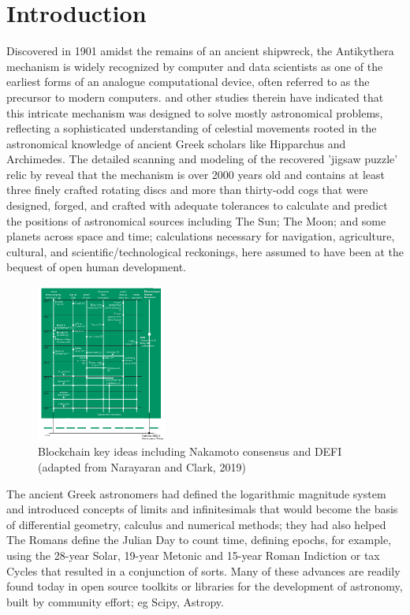 \documentclass[final,5p,times,twocolumn,authoryear]{elsarticle}
\begin{document}
\section{Introduction}
\label{sec:intro}
%
Discovered in 1901 amidst the remains of an ancient shipwreck, the Antikythera mechanism is widely recognized by computer and data scientists as one of the earliest forms of an analogue computational device, often referred to as the precursor to modern computers. \cite{Freeth2021} and other studies therein have indicated that this intricate mechanism was designed to solve mostly astronomical problems, reflecting a sophisticated understanding of celestial movements rooted in the astronomical knowledge of ancient Greek scholars like Hipparchus and Archimedes. The detailed scanning and modeling of the recovered 'jigsaw puzzle' relic by \cite{Freeth2021} reveal that the mechanism is over 2000 years old and contains at least three finely crafted rotating discs and more than thirty-odd cogs that were designed, forged, and crafted with adequate tolerances to calculate and predict the positions of astronomical sources including The Sun; The Moon; and some planets across space and time; calculations necessary for navigation, agriculture, cultural, and scientific/technological reckonings, here assumed to have been at the bequest of open human development.
 
 \begin{figure}
    \centering
    \includegraphics[width=0.38\textwidth]{narayanan3.png}
    \vspace*{-0.3cm}
    \caption{Blockchain key ideas including Nakamoto consensus and DEFI (adapted from Narayaran and Clark, 2019)}
    \label{fig:narayanan}
\end{figure}
 
 The ancient Greek astronomers had defined the logarithmic magnitude system and introduced concepts of limits and infinitesimals that would become the basis of differential geometry, calculus and numerical methods; they had also helped The Romans define the Julian Day to count time, defining epochs, for example, using the 28-year Solar, 19-year Metonic and 15-year Roman Indiction or tax Cycles that resulted in a conjunction of sorts. Many of these advances are readily found today in open source toolkits or libraries for the development of astronomy, built by community effort; eg Scipy, Astropy. 
 
\end{document}
